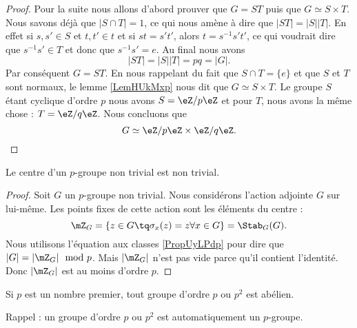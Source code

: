 \begin{proof}
    Pour la suite nous allons d'abord prouver que \( G=ST\) puis que \( G\simeq S\times T\). Nous savons déjà que \( | S\cap T |=1\), ce qui nous amène à dire que \( | ST |=| S | |T |\). En effet si \( s,s'\in S\) et \( t,t'\in t\) et si \( st=s't'\), alors \( t=s^{-1}s't'\), ce qui voudrait dire que \( s^{-1}s'\in T\) et donc que \( s^{-1}s'=e\). Au final nous avons
    \begin{equation}
        | ST |=| S | |T |=pq=| G |.
    \end{equation}
    Par conséquent \( G=ST\). En nous rappelant du fait que \( S\cap T=\{ e \}\) et que \( S\) et \( T\) sont normaux, le lemme \ref{LemHUkMxp} nous dit que \( G\simeq S\times T\). Le groupe \( S\) étant cyclique d'ordre \( p\) nous avons \( S=\eZ/p\eZ\) et pour \( T\), nous avons la même chose : \( T=\eZ/q\eZ\). Nous concluons que
    \begin{equation}
        G\simeq \eZ/p\eZ\times \eZ/q\eZ.
    \end{equation}
\end{proof}
 


\begin{theorem} \label{ThoImkljy}
    Le centre d'un \( p\)-groupe non trivial est non trivial.
\end{theorem}

\begin{proof}
    Soit \( G\) un $p$-groupe non trivial. Nous considérons l'action adjointe \( G\) sur lui-même. Les points fixes de cette action sont les éléments du centre :
    \begin{equation}
        \mZ_G=\{ z\in G\tq \sigma_x(z)=z\forall x\in G \}=\Stab_G(G).
    \end{equation}
    Nous utilisons l'équation aux classes \eqref{PropUyLPdp} pour dire que \( | G |=| \mZ_G |\mod p\). Mais \( | \mZ_G |\) n'est pas vide parce qu'il contient l'identité. Donc \( | \mZ_G |\) est au moins d'ordre \( p\).
\end{proof}

\begin{proposition} \label{PropssttFK}
    Si \( p\) est un nombre premier, tout groupe d'ordre \( p\) ou \( p^2\) est abélien.
\end{proposition}
Rappel : un groupe d'ordre \( p\) ou \( p^2\) est automatiquement un $p$-groupe.

